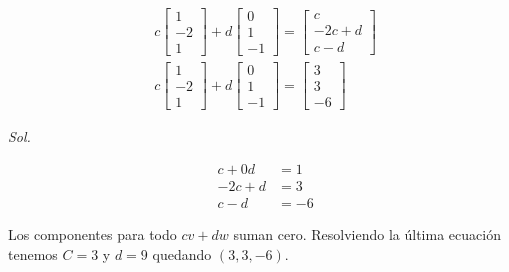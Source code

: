 \begin{problem}[Cada combinación de $v = (1, -2, 1)$ y $w = (0, 1, -1)$ tiene componentes que suman a ¿?. Encuentre $c$ y $d$ de modo que $cv + dw = (3,3, -6)$.]
\begin{align*}
	 & c\begin{bmatrix} 1\\ -2\\ 1 \end{bmatrix} + d\begin{bmatrix} 0\\ 1\\ -1 \end{bmatrix} = \begin{bmatrix} c\\-2c+d \\ c-d \end{bmatrix} \\
	 & c\begin{bmatrix} 1\\ -2\\ 1 \end{bmatrix} + d\begin{bmatrix} 0\\ 1\\ -1 \end{bmatrix} = \begin{bmatrix} 3\\ 3\\-6 \end{bmatrix}
\end{align*}
\end{problem}

\textit{ Sol. }

\begin{align*}
	 & c+0d  & =1  \\
	 & -2c+d & =3  \\
	 & c-d   & =-6
\end{align*}

Los componentes para todo $cv + dw$ suman cero. Resolviendo la última ecuación tenemos $C = 3$ y $d = 9$ quedando $(3,3, -6)$.

